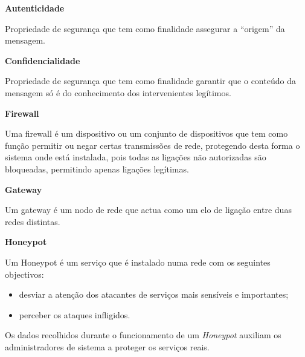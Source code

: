 \label{appendix:1}
\begin{description}
    \item \textbf{Autenticidade}

    Propriedade de segurança que tem como finalidade assegurar a “origem” da mensagem.
\end{description}

\begin{description}
    \item \textbf{Confidencialidade}

    Propriedade de segurança que tem como finalidade garantir que o conteúdo da mensagem só é do conhecimento dos intervenientes legítimos.
\end{description}

\begin{description}
    \item \textbf{Firewall}

    Uma firewall é um dispositivo ou um conjunto de dispositivos que tem como função permitir ou negar certas transmissões de rede, protegendo desta forma o sistema onde está instalada, pois todas as ligações não autorizadas são bloqueadas, permitindo apenas ligações legítimas.
\end{description}

\begin{description}
    \item \textbf{Gateway}
    
    Um gateway é um nodo de rede que actua como um elo de ligação entre duas redes distintas.
\end{description}

\begin{description}
    \item \textbf{Honeypot}

    Um Honeypot é um serviço que é instalado numa rede com os seguintes objectivos:
    \begin{itemize}
        \item desviar a atenção dos atacantes de serviços mais sensíveis e importantes;
        \item perceber os ataques infligidos.
    \end{itemize}
    
    Os dados recolhidos durante o funcionamento de um \textit{Honeypot} auxiliam os administradores de sistema a proteger os serviços reais.\\

    
\end{description}

